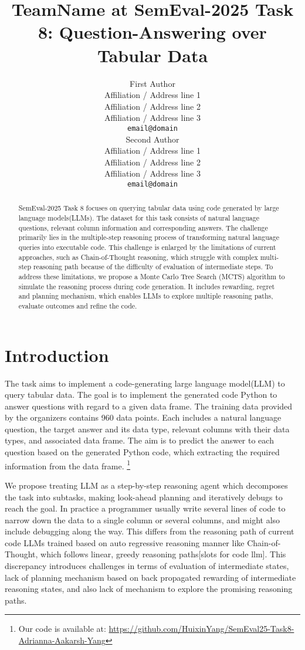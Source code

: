 \documentclass[11pt]{article}
\title{TeamName at SemEval-2025 Task 8: Question-Answering over Tabular Data}
\author{First Author \\
  Affiliation / Address line 1 \\
  Affiliation / Address line 2 \\
  Affiliation / Address line 3 \\
  \texttt{email@domain} \\\And
  Second Author \\
  Affiliation / Address line 1 \\
  Affiliation / Address line 2 \\
  Affiliation / Address line 3 \\
  \texttt{email@domain} \\}
\begin{document}
\maketitle
\begin{abstract}
SemEval-2025 Task 8 focuses on querying tabular data using code generated by large language models(LLMs). The dataset for this task consists of natural language questions, relevant column information and  corresponding answers. The challenge primarily lies in the multiple-step reasoning process of transforming natural language queries into executable code. This challenge is enlarged by the limitations of current approaches, such as Chain-of-Thought reasoning, which struggle with complex multi-step reasoning path because of the difficulty of evaluation of intermediate steps. To address these limitations, we propose a Monte Carlo Tree Search (MCTS) algorithm to simulate the reasoning process during code generation. It includes rewarding, regret and planning mechanism, which enables LLMs to explore multiple reasoning paths, evaluate outcomes and refine the code.


\end{abstract}

\section{Introduction}
The task aims to implement a code-generating large language model(LLM) to query tabular data. The goal is to implement the generated code Python to answer questions with regard to a given data frame. The training data provided by the organizers contains 960 data points. Each includes a natural language question, the target answer and its data type, relevant columns with their data types, and associated data frame. The aim is to predict the answer to each question based on the generated Python code, which extracting the required information from the data frame\citep{oses-grijalba-etal-2024-question}. \footnote{Our code is available at:  \url{https://github.com/HuixinYang/SemEval25-Task8-Adrianna-Aakarsh-Yang}} 

We propose treating LLM as a step-by-step reasoning agent which decomposes the task into subtasks, making look-ahead planning and iteratively debugs to reach the goal. In practice a programmer usually write several lines of code to narrow down the data to a single column or several columns, and might also include debugging along the way. This differs from the reasoning path of current code LLMs trained based on auto regressive reasoning manner like Chain-of-Thought, which follows linear, greedy reasoning paths[slots for code llm]. This discrepancy introduces challenges in terms of evaluation of intermediate states, lack of planning mechanism based on back propagated rewarding of intermediate reasoning states, and also lack of mechanism to explore the promising reasoning paths\citep{zhang2023planninglargelanguagemodels}. 
\end{document}
